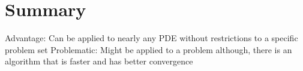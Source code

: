 \documentclass[./\jobname.tex]{subfiles}
\begin{document}
\chapter{Summary}

Advantage: Can be applied to nearly any PDE without restrictions to a specific problem set
Problematic: Might be applied to a problem although, there is an algorithm that is faster and has better convergence
\end{document}
